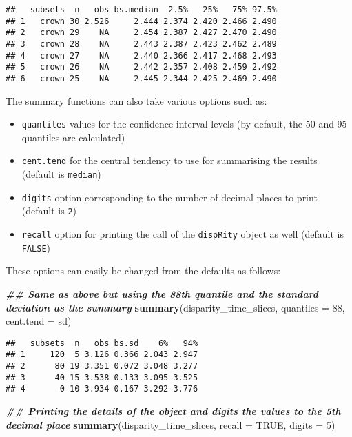 \documentclass[
]{book}
\newenvironment{Shaded}{\begin{snugshade}}{\end{snugshade}}
\newcommand{\AttributeTok}[1]{\textcolor[rgb]{0.13,0.29,0.53}{#1}}
\newcommand{\ConstantTok}[1]{\textcolor[rgb]{0.56,0.35,0.01}{#1}}
\newcommand{\DecValTok}[1]{\textcolor[rgb]{0.00,0.00,0.81}{#1}}
\newcommand{\DocumentationTok}[1]{\textcolor[rgb]{0.56,0.35,0.01}{\textbf{\textit{#1}}}}
\newcommand{\FunctionTok}[1]{\textcolor[rgb]{0.13,0.29,0.53}{\textbf{#1}}}
\newcommand{\NormalTok}[1]{#1}
\providecommand{\tightlist}{%
  \setlength{\itemsep}{0pt}\setlength{\parskip}{0pt}}
\begin{document}
\begin{verbatim}
##   subsets  n   obs bs.median  2.5%   25%   75% 97.5%
## 1   crown 30 2.526     2.444 2.374 2.420 2.466 2.490
## 2   crown 29    NA     2.454 2.387 2.427 2.470 2.490
## 3   crown 28    NA     2.443 2.387 2.423 2.462 2.489
## 4   crown 27    NA     2.440 2.366 2.417 2.468 2.493
## 5   crown 26    NA     2.442 2.357 2.408 2.459 2.492
## 6   crown 25    NA     2.445 2.344 2.425 2.469 2.490
\end{verbatim}

The summary functions can also take various options such as:

\begin{itemize}
\tightlist
\item
  \texttt{quantiles} values for the confidence interval levels (by default, the 50 and 95 quantiles are calculated)
\item
  \texttt{cent.tend} for the central tendency to use for summarising the results (default is \texttt{median})
\item
  \texttt{digits} option corresponding to the number of decimal places to print (default is \texttt{2})
\item
  \texttt{recall} option for printing the call of the \texttt{dispRity} object as well (default is \texttt{FALSE})
\end{itemize}

These options can easily be changed from the defaults as follows:

\begin{Shaded}
\begin{Highlighting}[]
\DocumentationTok{\#\# Same as above but using the 88th quantile and the standard deviation as the summary }
\FunctionTok{summary}\NormalTok{(disparity\_time\_slices, }\AttributeTok{quantiles =} \DecValTok{88}\NormalTok{, }\AttributeTok{cent.tend =}\NormalTok{ sd)}
\end{Highlighting}
\end{Shaded}

\begin{verbatim}
##   subsets  n   obs bs.sd    6%   94%
## 1     120  5 3.126 0.366 2.043 2.947
## 2      80 19 3.351 0.072 3.048 3.277
## 3      40 15 3.538 0.133 3.095 3.525
## 4       0 10 3.934 0.167 3.292 3.776
\end{verbatim}

\begin{Shaded}
\begin{Highlighting}[]
\DocumentationTok{\#\# Printing the details of the object and digits the values to the 5th decimal place}
\FunctionTok{summary}\NormalTok{(disparity\_time\_slices, }\AttributeTok{recall =} \ConstantTok{TRUE}\NormalTok{, }\AttributeTok{digits =} \DecValTok{5}\NormalTok{)}
\end{Highlighting}
\end{Shaded}
\end{document}
